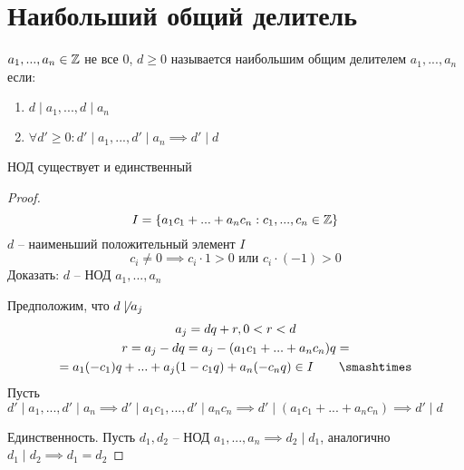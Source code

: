 \documentclass[main]{subfiles}
\begin{document}
\chapter[НОД]{Наибольший общий делитель}

$a_1, ..., a_n \in \mathbb{Z}$ не все $0$, $d\ge 0$ называется наибольшим
общим делителем $a_1, ..., a_n$ если:
\begin{enumerate}
    \item $d \mid a_1, ...,  d\mid  a_n$
    \item $\forall d' \ge 0: d'\mid a_1, ..., d' \mid a_n \implies d'\mid d$
\end{enumerate}

\begin{definition}
    НОД существует и единственный
\end{definition}
\begin{proof}
    \[I = \{a_1 c_1+ ... + a_n c_n: c_1, ..., c_n \in \mathbb{Z}\}\]
    $d$ -- наименьший положительный элемент $I$
    \[c_i \neq 0 \implies c_i \cdot 1 >0 \text{ или } c_i\cdot(-1)>0\]
    Доказать: $d$ -- НОД $a_1, ..., a_n$

    Предположим, что $d \not\mid a_j$
    \begin{gather*}
        a_j = dq+r, 0 < r < d\\
        r = a_j -dq = a_j - (a_1 c_1 + ... + a_n c_n)q=\\
        = a_1 (-c_1)q + ... + a_j(1-c_1q ) + a_n (-c_nq) \in I \qquad \contradiction
    \end{gather*}
    Пусть $d' \mid a_1, ..., d'\mid a_n \implies d'\mid a_1 c_1, ...,
        d'\mid a_n c_n \implies d' \mid (a_1 c_1 + ... + a_n c_n) \implies d'\mid d$

    Единственность. Пусть $d_1, d_2$ -- НОД $a_1, ..., a_n \implies d_2 \mid d_1$,
    аналогично $d_1\mid d_2 \implies d_1 = d_2$
\end{proof}
\end{document}
